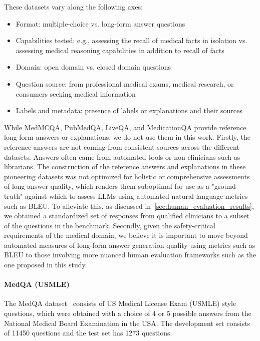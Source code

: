 These datasets vary along the following axes:

\begin{itemize}
    \item Format: multiple-choice vs. long-form answer questions \item Capabilities tested: e.g., assessing the recall of medical facts in isolation vs. assessing medical reasoning capabilities in addition to recall of facts \item Domain: open domain vs. closed domain questions \item Question source: from professional medical exams, medical research, or consumers seeking medical information \item Labels and metadata: presence of labels or explanations and their sources
\end{itemize}

While MedMCQA, PubMedQA, LiveQA, and MedicationQA provide reference long-form answers or explanations, we do not use them in this work. Firstly, the reference answers are not coming from consistent sources across the different datasets. Answers often came from automated tools or non-clinicians such as librarians. The construction of the reference answers and explanations in these pioneering datasets was not optimized for holistic or comprehensive assessments of long-answer quality, which renders them suboptimal for use as a "ground truth" against which to assess LLMs using automated natural language metrics such as BLEU. To alleviate this, as discussed in~\ref{sec:human_evaluation_results}, we obtained a standardized set of responses from qualified clinicians to a subset of the questions in the benchmark. Secondly, given the safety-critical requirements of the medical domain, we believe it is important to move beyond automated measures of long-form answer generation quality using metrics such as BLEU to those involving more nuanced human evaluation frameworks such as the one proposed in this study.

\paragraph{MedQA (USMLE)} The MedQA dataset~\cite{jin2021disease} consists of US Medical License Exam (USMLE) style questions, which were obtained with a choice of 4 or 5 possible answers from the National Medical Board Examination in the USA. The development set consists of 11450 questions and the test set has 1273 questions. 

